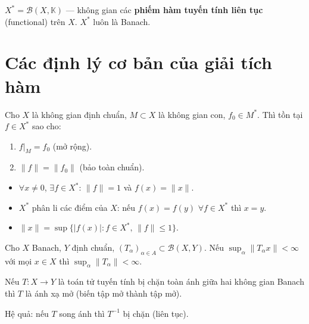 \documentclass[12pt,a4paper]{article}
\begin{document}
\begin{dinhnghia}[title={Không gian đối ngẫu}]
  $X^* = \mathcal{B}(X, \mathbb{K})$ --- không gian các \textbf{phiếm hàm tuyến tính liên tục} (functional) trên $X$. $X^*$ luôn là Banach.
\end{dinhnghia}

\section{Các định lý cơ bản của giải tích hàm}

\begin{dinhly}[title={Định lý Hahn--Banach (dạng giải tích)}]
  Cho $X$ là không gian định chuẩn, $M \subset X$ là không gian con, $f_0 \in M^*$. Thì tồn tại $f \in X^*$ sao cho:
  \begin{enumerate}
    \item $f|_M = f_0$ (mở rộng).
    \item $\|f\| = \|f_0\|$ (bảo toàn chuẩn).
  \end{enumerate}
\end{dinhly}

\begin{tinhchat}[title={Hệ quả Hahn--Banach}]
  \begin{itemize}
    \item $\forall x \ne 0$, $\exists f \in X^*$: $\|f\| = 1$ và $f(x) = \|x\|$.
    \item $X^*$ phân li các điểm của $X$: nếu $f(x) = f(y)$ $\forall f \in X^*$ thì $x = y$.
    \item $\|x\| = \sup\{|f(x)| : f \in X^*,\, \|f\| \le 1\}$.
  \end{itemize}
\end{tinhchat}

\begin{dinhly}[title={Nguyên lý bị chặn đều (Banach--Steinhaus)}]
  Cho $X$ Banach, $Y$ định chuẩn, $(T_\alpha)_{\alpha \in A} \subset \mathcal{B}(X, Y)$. Nếu $\sup_\alpha \|T_\alpha x\| < \infty$ với mọi $x \in X$ thì $\sup_\alpha \|T_\alpha\| < \infty$.
\end{dinhly}

\begin{dinhly}[title={Định lý ánh xạ mở (Banach)}]
  Nếu $T: X \to Y$ là toán tử tuyến tính bị chặn toàn ánh giữa hai không gian Banach thì $T$ là ánh xạ mở (biến tập mở thành tập mở).

  Hệ quả: nếu $T$ song ánh thì $T^{-1}$ bị chặn (liên tục).
\end{dinhly}
\end{document}
